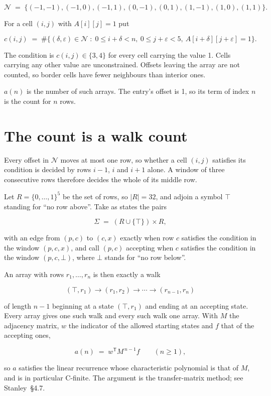 \documentclass[11pt]{article}
\theoremstyle{definition}
\begin{document}
\[\mathcal{N} \;=\; \{(-1,-1), (-1,0), (-1,1), (0,-1), (0,1), (1,-1), (1,0), (1,1)\}.\]

For a cell $(i,j)$ with $A[i][j] = 1$ put

\[c(i,j) \;=\; \#\bigl\{(\delta,\varepsilon)\in\mathcal{N} \;:\; 0\le i+\delta<n,\ 0\le j+\varepsilon<5,\ A[i+\delta][j+\varepsilon] = 1\bigr\}.\]

The condition is $c(i,j) \in \{3, 4\}$ for every cell carrying the value 1. Cells carrying any other value are unconstrained. Offsets leaving the array are not counted, so border cells have fewer neighbours than interior ones.

$a(n)$ is the number of such arrays. The entry's offset is 1, so its term of index $n$ is the count for $n$ rows.

\section{The count is a walk count}

Every offset in $\mathcal{N}$ moves at most one row, so whether a cell $(i,j)$ satisfies its condition is decided by rows $i-1$, $i$ and $i+1$ alone. A window of three consecutive rows therefore decides the whole of its middle row.

Let $R = \{0,\dots,1\}^{5}$ be the set of rows, so $|R| = 32$, and adjoin a symbol $\top$ standing for ``no row above''. Take as states the pairs

\[\Sigma \;=\; (R \cup \{\top\}) \times R,\]

with an edge from $(p,c)$ to $(c,x)$ exactly when row $c$ satisfies the condition in the window $(p,c,x)$, and call $(p,c)$ accepting when $c$ satisfies the condition in the window $(p,c,\bot)$, where $\bot$ stands for ``no row below''.

An array with rows $r_1,\dots,r_n$ is then exactly a walk

\[(\top,r_1) \to (r_1,r_2) \to \cdots \to (r_{n-1},r_n)\]

of length $n-1$ beginning at a state $(\top,r_1)$ and ending at an accepting state. Every array gives one such walk and every such walk one array. With $M$ the adjacency matrix, $w$ the indicator of the allowed starting states and $f$ that of the accepting ones,

\[a(n) \;=\; w^{\mathsf T} M^{\,n-1} f \qquad (n \ge 1),\]

so $a$ satisfies the linear recurrence whose characteristic polynomial is that of $M$, and is in particular C-finite. The argument is the transfer-matrix method; see Stanley~\S4.7.
\end{document}
